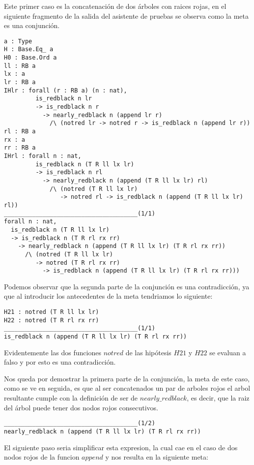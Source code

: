 Este primer caso es la concatenaci\'on de dos \'arboles con raices rojas, en el siguiente
fragmento de la salida del asistente de pruebas se observa como la meta es una conjunci\'on.

\begin{verbatim}
a : Type
H : Base.Eq_ a
H0 : Base.Ord a
ll : RB a
lx : a
lr : RB a
IHlr : forall (r : RB a) (n : nat),
         is_redblack n lr
         -> is_redblack n r
           -> nearly_redblack n (append lr r)
             /\ (notred lr -> notred r -> is_redblack n (append lr r))
rl : RB a
rx : a
rr : RB a
IHrl : forall n : nat,
         is_redblack n (T R ll lx lr)
         -> is_redblack n rl
           -> nearly_redblack n (append (T R ll lx lr) rl)
             /\ (notred (T R ll lx lr)
                -> notred rl -> is_redblack n (append (T R ll lx lr) rl))
______________________________________(1/1)
forall n : nat,
  is_redblack n (T R ll lx lr)
  -> is_redblack n (T R rl rx rr)
    -> nearly_redblack n (append (T R ll lx lr) (T R rl rx rr))
      /\ (notred (T R ll lx lr)
         -> notred (T R rl rx rr)
           -> is_redblack n (append (T R ll lx lr) (T R rl rx rr)))
\end{verbatim}

Podemos observar que la segunda parte de la conjunci\'on es una contradicci\'on, ya que al
introducir los antecedentes de la meta tendriamos lo siguiente:

\begin{verbatim}
H21 : notred (T R ll lx lr)
H22 : notred (T R rl rx rr)
______________________________________(1/1)
is_redblack n (append (T R ll lx lr) (T R rl rx rr))
\end{verbatim}

Evidentemente las dos funciones $notred$ de las hip\'otesis $H21$ y $H22$ se evaluan a falso y por
esto es una contradicci\'on.

Nos queda por demostrar la primera parte de la conjunci\'on, la meta de este caso, como se ve en
seguida, es que al ser concatenados un par de arboles rojos el arbol resultante cumple con la
definici\'on de ser de $nearly\_redblack$, es decir, que la raiz del \'arbol puede tener dos nodos
rojos consecutivos.

\begin{verbatim}
______________________________________(1/2)
nearly_redblack n (append (T R ll lx lr) (T R rl rx rr))
\end{verbatim}

El siguiente paso seria simplificar esta expresion, la cual cae en el caso de dos nodos rojos de la funcion $append$ y nos resulta en la siguiente meta:

